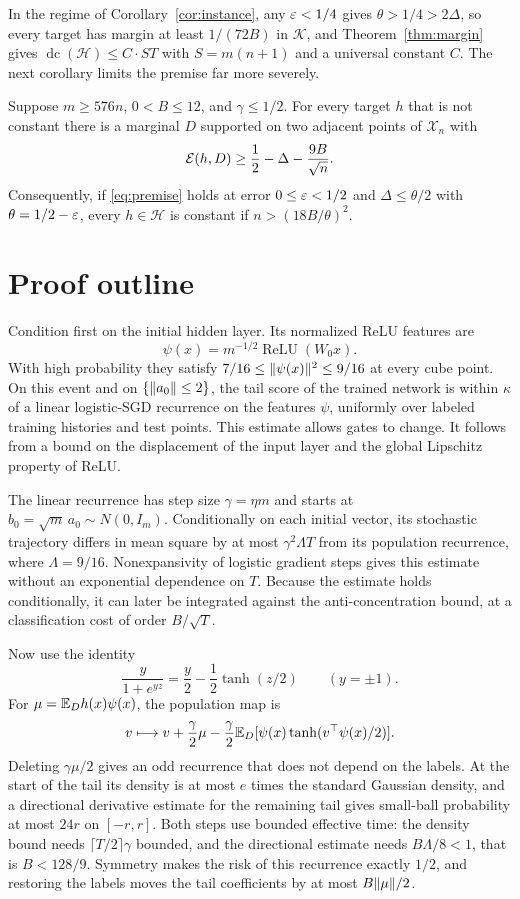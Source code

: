 \documentclass[11pt,letterpaper,pmlr,twoside]{jmlr}
\newcommand{\X}{\mathcal X}\newcommand{\Hc}{\mathcal H}
\newcommand{\Kc}{\mathcal K}\newcommand{\sgn}{\operatorname{sign}}
\newcommand{\relu}{\operatorname{ReLU}}\newcommand{\dc}{\operatorname{dc}}
\begin{document}
In the regime of Corollary~\ref{cor:instance}, any $\varepsilon<1/4$ gives $\theta>1/4>2\Delta$, so every target has margin at least $1/(72B)$ in $\Kc$, and Theorem~\ref{thm:margin} gives $\dc(\Hc)\le C\cdot ST$ with $S=m(n+1)$ and a universal constant $C$. The next corollary limits the premise far more severely.

\begin{corollary}
\label{cor:edge}
Suppose $m\ge576n$, $0<B\le12$, and $\gamma\le1/2$. For every target $h$ that is not constant there is a marginal $D$ supported on two adjacent points of $\X_n$ with
\[
 \mathcal E(h,D)\ge\frac12-\Delta-\frac{9B}{\sqrt n}.
\]
Consequently, if \eqref{eq:premise} holds at error $0\le\varepsilon<1/2$ and $\Delta\le\theta/2$ with $\theta=1/2-\varepsilon$, every $h\in\Hc$ is constant if $n>(18B/\theta)^2$.
\end{corollary}

\section{Proof outline}
\label{sec:outline}
Condition first on the initial hidden layer. Its normalized ReLU features are
\[
 \psi(x)=m^{-1/2}\relu(W_0x).
\]
With high probability they satisfy $7/16\le\lVert \psi(x)\rVert^2\le9/16$ at every cube point. On this event and on $\{\lVert a_0\rVert\le2\}$, the tail score of the trained network is within $\kappa$ of a linear logistic-SGD recurrence on the features $\psi$, uniformly over labeled training histories and test points. This estimate allows gates to change. It follows from a bound on the displacement of the input layer and the global Lipschitz property of ReLU.

The linear recurrence has step size $\gamma=\eta m$ and starts at $b_0=\sqrt m\,a_0\sim N(0,I_m)$. Conditionally on each initial vector, its stochastic trajectory differs in mean square by at most $\gamma^2\Lambda T$ from its population recurrence, where $\Lambda=9/16$. Nonexpansivity of logistic gradient steps gives this estimate without an exponential dependence on $T$. Because the estimate holds conditionally, it can later be integrated against the anti-concentration bound, at a classification cost of order $B/\sqrt T$.

Now use the identity
\begin{equation}
 \frac{y}{1+e^{yz}}=\frac y2-\frac12\tanh(z/2)\qquad(y=\pm1).
 \label{eq:logistic-decomp}
\end{equation}
For $\mu=\mathbb E_Dh(x)\psi(x)$, the population map is
\[
 v\longmapsto v+\frac\gamma2\mu
      -\frac\gamma2\mathbb E_D[\psi(x)\tanh(v^\top\psi(x)/2)].
\]
Deleting $\gamma\mu/2$ gives an odd recurrence that does not depend on the labels. At the start of the tail its density is at most $e$ times the standard Gaussian density, and a directional derivative estimate for the remaining tail gives small-ball probability at most $24r$ on $[-r,r]$. Both steps use bounded effective time: the density bound needs $\lceil T/2\rceil\gamma$ bounded, and the directional estimate needs $B\Lambda/8<1$, that is $B<128/9$. Symmetry makes the risk of this recurrence exactly $1/2$, and restoring the labels moves the tail coefficients by at most $B\lVert \mu\rVert/2$.
\end{document}
